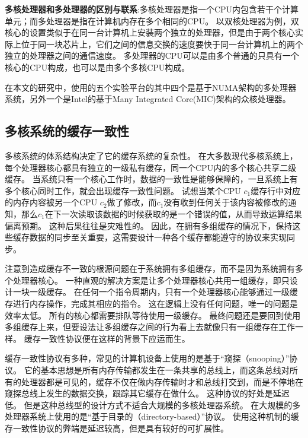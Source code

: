\textbf{多核处理器和多处理器的区别与联系}:多核处理器是指一个CPU内包含若干个计算单元；而多处理器是指在计算机内存在多个相同的CPU。
以双核处理器为例，双核心的设置类似于在同一台计算机上安装两个独立的处理器，但是由于两个核心实际上位于同一块芯片上，它们之间的信息交换的速度要快于同一台计算机上的两个独立的处理器之间的通信速度。
多处理器的CPU可以是由多个普通的只具有一个核心的CPU构成，也可以是由多个多核CPU构成。

在本文的研究中，使用的五个实验平台的其中四个是基于NUMA架构的多处理器系统，另外一个是Intel的基于Many Integrated Core(MIC)架构的众核处理器。

\subsection{多核系统的缓存一致性}
多核系统的体系结构决定了它的缓存系统的复杂性。
在大多数现代多核系统上，每个处理器核心都具有独立的一级私有缓存，同一个CPU内的多个核心共享二级缓存。
当系统只有一个核心工作时，数据的一致性是能够保障的，一旦系统上有多个核心同时工作，就会出现缓存一致性问题。
试想当某个CPU $c_1$缓存行中对应的内存内容被另一个CPU $c_2$做了修改，而$c_1$没有收到任何关于该内容被修改的通知，那么$c_1$在下一次读取该数据的时候获取的是一个错误的值，从而导致运算结果偏离预期。
这种后果往往是灾难性的。
因此，在拥有多组缓存的情况下，保持这些缓存数据的同步至关重要，这需要设计一种各个缓存都能遵守的协议来实现同步。

注意到造成缓存不一致的根源问题在于系统拥有多组缓存，而不是因为系统拥有多个处理器核心。
一种直观的解决方案是让多个处理器核心共用一组缓存，即只设计一块一级缓存。
在任何一个指令周期内，只有一个处理器核心能够通过一级缓存进行内存操作，完成其相应的指令。
这在逻辑上没有任何问题，唯一的问题是效率太低。
所有的核心都需要排队等待使用一级缓存。
最终问题还是要回到使用多组缓存上来，但要设法让多组缓存之间的行为看上去就像只有一组缓存在工作一样。
缓存一致性协议便在这样的背景下应运而生。

缓存一致性协议有多种，常见的计算机设备上使用的是基于“窥探（snooping）”协议。
它的基本思想是所有内存传输都发生在一条共享的总线上，而这条总线对所有的处理器都是可见的，缓存不仅在做内存传输时才和总线打交到，而是不停地在窥探总线上发生的数据交换，跟踪其它缓存在做什么。
这种协议的好处是延迟低。
但是这种总线型的设计方式不适合大规模的多核处理器系统。
在大规模的多处理器系统上使用的是“基于目录的（directory-based）”协议。
使用这种机制的缓存一致性协议的弊端是延迟较高，但是具有较好的可扩展性。

